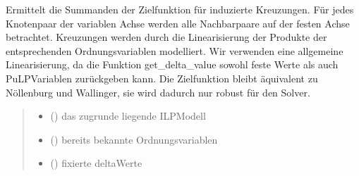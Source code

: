 \documentclass[a4paper,10pt,ngerman]{sphinxmanual}
\begin{document}
\begin{fulllineitems}
\label{\detokenize{api:src.ip_model.induced_crossings}}
\pysigstartsignatures
\pysiglinewithargsret
{}
{\sphinxparamcomma {}\sphinxparamcomma {}\sphinxparamcomma {}\sphinxparamcomma {}\sphinxparamcomma {}\sphinxparamcomma {}}
{}
\pysigstopsignatures
\sphinxAtStartPar
Ermittelt die Summanden der Zielfunktion für induzierte Kreuzungen. Für jedes Knotenpaar der variablen Achse werden alle Nachbarpaare auf
der festen Achse betrachtet. Kreuzungen werden durch die Linearisierung der Produkte der entsprechenden Ordnungsvariablen modelliert. Wir verwenden eine allgemeine
Linearisierung, da die Funktion get\_delta\_value sowohl feste Werte als auch PuLP\sphinxhyphen{}Variablen zurückgeben kann. Die Zielfunktion bleibt äquivalent zu Nöllenburg
und Wallinger, sie wird dadurch nur robust für den Solver.
\begin{quote}\begin{description}
\begin{itemize}
\item {} 
\sphinxAtStartPar
{} () \textendash{} das zugrunde liegende ILP\sphinxhyphen{}Modell

\item {} 
\sphinxAtStartPar
{} () \textendash{} bereits bekannte Ordnungsvariablen

\item {} 
\sphinxAtStartPar
{} () \textendash{} fixierte delta\sphinxhyphen{}Werte


\end{itemize}
\end{description}
\end{quote}
\end{fulllineitems}
\end{document}

